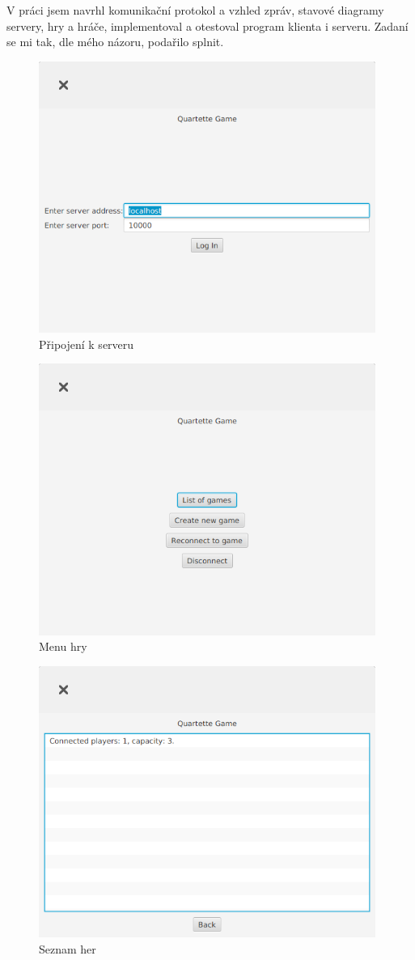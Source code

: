 \documentclass[12pt, a4paper]{article}
\begin{document}
	V práci jsem navrhl komunikační protokol a vzhled zpráv, stavové diagramy servery, hry a hráče, implementoval a otestoval program klienta i serveru. Zadaní se mi tak, dle mého názoru, podařilo splnit.
	
	\begin{figure}[ht!]
		\centering
		\caption{Připojení k serveru}
		\label{Login}
		\includegraphics[width=11cm]{img/Login.png}
	\end{figure}
	\begin{figure}[ht!]
		\centering
		\caption{Menu hry}
		\label{Menu}
		\includegraphics[width=11cm]{img/Menu.png}
	\end{figure}
	\begin{figure}[ht!]
		\centering
		\caption{Seznam her}
		\label{List}
		\includegraphics[width=11cm]{img/List.png}
	\end{figure}
\end{document}
